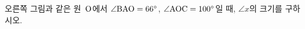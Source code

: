 \noindent\begin{minipage}[t]{0.58\linewidth}\vspace{0pt}\raggedright 오른쪽 그림과 같은 원~$\mathrm{O}$에서 $\angle\mathrm{BAO}=66^\circ$, $\angle\mathrm{AOC}=100^\circ$일 때, $\angle x$의 크기를 구하시오.\end{minipage}\hfill\begin{minipage}[t]{0.4\linewidth}\vspace{0pt}\centering \resizebox{\ifdim\width>\linewidth\linewidth\else\width\fi}{!}{}\end{minipage}\par
